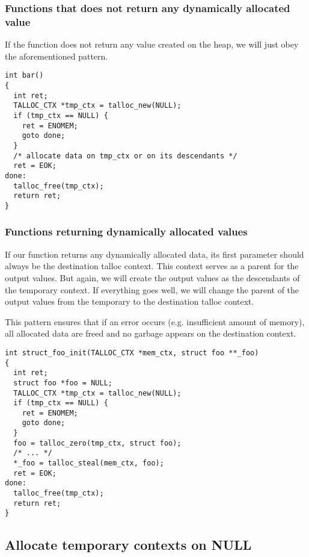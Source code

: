 \subsubsection{Functions that does not return any dynamically allocated value}

If the function does not return any value created on the heap, we will just obey
the aforementioned pattern.

\begin{lstlisting}[caption={Temporary context \#1},label=lst:tmp-ctx-1]
int bar()
{
  int ret;
  TALLOC_CTX *tmp_ctx = talloc_new(NULL);
  if (tmp_ctx == NULL) {
    ret = ENOMEM;
    goto done;
  }
  /* allocate data on tmp_ctx or on its descendants */
  ret = EOK;
done:
  talloc_free(tmp_ctx);
  return ret;
}
\end{lstlisting}

\subsubsection{Functions returning dynamically allocated values}

If our function returns any dynamically allocated data, its first parameter
should always be the destination talloc context. This context serves as a parent
for the output values. But again, we will create the output values as the
descendants of the temporary context. If everything goes well, we will change
the parent of the output values from the temporary to the destination talloc
context.

This pattern ensures that if an error occurs (e.g. insufficient amount of
memory), all allocated data are freed and no garbage appears on the destination
context.

\begin{lstlisting}[caption={Temporary context \#2},label=lst:tmp-ctx-2]
int struct_foo_init(TALLOC_CTX *mem_ctx, struct foo **_foo)
{
  int ret;
  struct foo *foo = NULL;
  TALLOC_CTX *tmp_ctx = talloc_new(NULL);
  if (tmp_ctx == NULL) {
    ret = ENOMEM;
    goto done;
  }
  foo = talloc_zero(tmp_ctx, struct foo);
  /* ... */
  *_foo = talloc_steal(mem_ctx, foo);
  ret = EOK;
done:
  talloc_free(tmp_ctx);
  return ret;
}
\end{lstlisting}

\subsection{Allocate temporary contexts on NULL}
\label{talloc:subsec:tmp-ctx-on-null}

